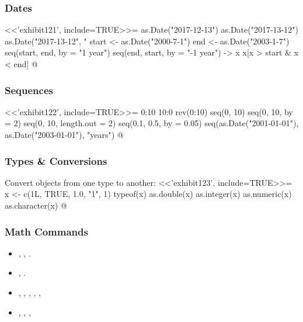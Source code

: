 

\begin{frame}[fragile]%
\frametitle{Dates}
<<'exhibit121', include=TRUE>>=
  as.Date("2017-12-13")
  as.Date("2017-13-12")  
  as.Date("2017-13-12", "%
  start <- as.Date("2000-7-1")
  end <- as.Date("2003-1-7")
  seq(start, end, by = "1 year")
  seq(end, start, by = "-1 year") -> x
  x[x > start & x < end]
@
\end{frame}


\begin{frame}[fragile]%
\frametitle{Sequences}
<<'exhibit122', include=TRUE>>=
  0:10
  10:0
  rev(0:10)
  seq(0, 10)
  seq(0, 10, by = 2)
  seq(0, 10, length.out = 2)
  seq(0.1, 0.5, by = 0.05)
  seq(as.Date("2001-01-01"), as.Date("2003-01-01"), "years")
@
\end{frame}


\begin{frame}[fragile]%
\frametitle{Types \& Conversions}
Convert objects from one type to another:
<<'exhibit123', include=TRUE>>=
  x <- c(1L, TRUE, 1.0, "1", 1)
  typeof(x)
  as.double(x)
  as.integer(x)
  as.numeric(x)
  as.character(x)
@
\end{frame}


\begin{frame}[fragile]
\frametitle{\Rlogo Math Commands}
\begin{itemize}
\item {}, , .
\item {}, .
\item {}, , , , , 
\item {}, , , 
\end{itemize}
\end{frame}


